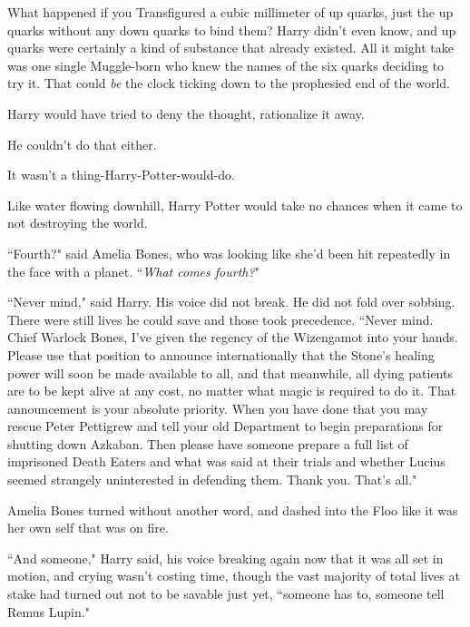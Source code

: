 What happened if you Transfigured a cubic millimeter of up quarks, just the up quarks without any down quarks to bind them? Harry didn't even know, and up quarks were certainly a kind of substance that already existed. All it might take was one single Muggle-born who knew the names of the six quarks deciding to try it. That could \emph{be} the clock ticking down to the prophesied end of the world.

Harry would have tried to deny the thought, rationalize it away.

He couldn't do that either.

It wasn't a thing-Harry-Potter-would-do.

Like water flowing downhill, Harry Potter would take no chances when it came to not destroying the world.

``Fourth?" said Amelia Bones, who was looking like she'd been hit repeatedly in the face with a planet. ``\emph{What comes fourth?}"

``Never mind," said Harry. His voice did not break. He did not fold over sobbing. There were still lives he could save and those took precedence. ``Never mind. Chief Warlock Bones, I've given the regency of the Wizengamot into your hands. Please use that position to announce internationally that the Stone's healing power will soon be made available to all, and that meanwhile, all dying patients are to be kept alive at any cost, no matter what magic is required to do it. That announcement is your absolute priority. When you have done that you may rescue Peter Pettigrew and tell your old Department to begin preparations for shutting down Azkaban. Then please have someone prepare a full list of imprisoned Death Eaters and what was said at their trials and whether Lucius seemed strangely uninterested in defending them. Thank you. That's all."

Amelia Bones turned without another word, and dashed into the Floo like it was her own self that was on fire.

``And someone," Harry said, his voice breaking again now that it was all set in motion, and crying wasn't costing time, though the vast majority of total lives at stake had turned out not to be savable just yet, ``someone has to, someone tell Remus Lupin."

